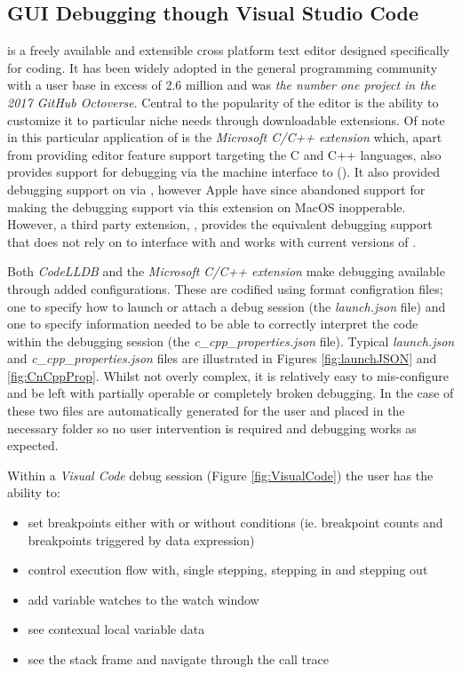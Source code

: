 \hypertarget{visual-studio-code-extensions}{%
\subsection{GUI Debugging though Visual Studio Code}
\label{visual-studio-code-extensions}}
 is a freely available and extensible cross platform text editor designed specifically for coding. It has been widely adopted in the general programming
community with a user base in excess of 2.6 million\citep{VCusers} and was \emph{the number one project in the 2017 GitHub Octoverse}. Central to the 
popularity of the editor is the ability to customize it to particular niche needs through downloadable extensions. Of note in this particular application of  
is the \emph{Microsoft C/C++ extension} \citep{VSCodeCCppExt} which, apart from providing editor feature support targeting the C and C++ languages, also provides support for 
debugging via the machine interface to  (). It also provided debugging support on  via , however Apple have since abandoned support for  making 
the debugging support via this extension on MacOS inopperable. However, a third party extension, \citep{CodeLLDB}, provides the equivalent debugging support that does not rely on
 to interface with  and works with current versions of . 

Both \emph{CodeLLDB} and the \emph{Microsoft C/C++ extension} make debugging available through added configurations. These are codified using \citep{JSON} format configration files;
one to specify how to launch or attach a debug session (the \emph{launch.json} file) and one to specify information needed to be able to correctly interpret the code within the debugging 
session (the \emph{c\_cpp\_properties.json} file). Typical \emph{launch.json} and \emph{c\_cpp\_properties.json} files are illustrated in Figures \ref{fig:launchJSON} and \ref{fig:CnCppProp}.
Whilst not overly complex, it is relatively easy to mis-configure and be left with partially operable or completely broken debugging. In the case of  these two files are 
automatically generated for the user and placed in the necessary folder so no user intervention is required and debugging works as expected.

Within a \emph{Visual Code} debug session (Figure \ref{fig:VisualCode}) the user has the ability to:

\begin{itemize}
\item set breakpoints either with or without conditions (ie. breakpoint counts and breakpoints triggered by data expression)
\item control execution flow with, single stepping, stepping in and stepping out
\item add variable watches to the watch window
\item see contexual local variable data
\item see the stack frame and navigate through the call trace
\end{itemize}

